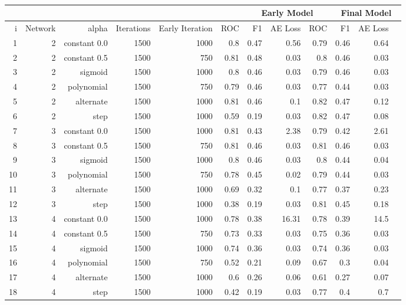 \begin{table}[!h] { \footnotesize \centering
		\begin{tabular}{rrrrrrrrrrrr}
			&&&&& &  \multicolumn{3}{|c|}{Early Model} &  \multicolumn{3}{c|}{Final Model}    \\
			\hline
			i  & Network & alpha        & Iterations & Early Iteration & ROC  & F1   & AE Loss & ROC  & F1   & AE Loss \\
			\hline
			1  & 2       & constant 0.0 & 1500       & 1000 & 0.8  & 0.47 & 0.56    & 0.79 & 0.46 & 0.64 \\
			2  & 2       & constant 0.5 & 1500       & 750  & 0.81 & 0.48 & 0.03    & 0.8  & 0.46 & 0.03 \\
			3  & 2       & sigmoid      & 1500       & 1000 & 0.8  & 0.46 & 0.03    & 0.79 & 0.46 & 0.03 \\
			4  & 2       & polynomial   & 1500       & 750  & 0.79 & 0.46 & 0.03    & 0.77 & 0.44 & 0.03 \\
			5  & 2       & alternate    & 1500       & 1000 & 0.81 & 0.46 & 0.1     & 0.82 & 0.47 & 0.12 \\
			6  & 2       & step         & 1500       & 1000 & 0.59 & 0.19 & 0.03    & 0.82 & 0.47 & 0.08 \\
			\hline
			7  & 3       & constant 0.0 & 1500       & 1000 & 0.81 & 0.43 & 2.38    & 0.79 & 0.42 & 2.61 \\
			8  & 3       & constant 0.5 & 1500       & 750  & 0.81 & 0.46 & 0.03    & 0.81 & 0.46 & 0.03 \\
			9  & 3       & sigmoid      & 1500       & 1000 & 0.8  & 0.46 & 0.03    & 0.8  & 0.44 & 0.04 \\
			10 & 3       & polynomial   & 1500       & 750  & 0.78 & 0.45 & 0.02    & 0.79 & 0.44 & 0.03 \\
			11 & 3       & alternate    & 1500       & 1000 & 0.69 & 0.32 & 0.1     & 0.77 & 0.37 & 0.23 \\
			12 & 3       & step         & 1500       & 1000 & 0.38 & 0.19 & 0.03    & 0.81 & 0.45 & 0.18 \\
			\hline
			13 & 4       & constant 0.0 & 1500       & 1000 & 0.78 & 0.38 & 16.31   & 0.78 & 0.39 & 14.5 \\
			14 & 4       & constant 0.5 & 1500       & 750  & 0.73 & 0.33 & 0.03    & 0.75 & 0.36 & 0.03 \\
			15 & 4       & sigmoid      & 1500       & 1000 & 0.74 & 0.36 & 0.03    & 0.74 & 0.36 & 0.03 \\
			16 & 4       & polynomial   & 1500       & 750  & 0.52 & 0.21 & 0.09    & 0.67 & 0.3  & 0.04 \\
			17 & 4       & alternate    & 1500       & 1000 & 0.6  & 0.26 & 0.06    & 0.61 & 0.27 & 0.07 \\
			18 & 4       & step         & 1500       & 1000 & 0.42 & 0.19 & 0.03    & 0.77 & 0.4  & 0.7  \\


			\hline
		\end{tabular}  } \caption{} \label{tab:auto_final_1} \end{table}

